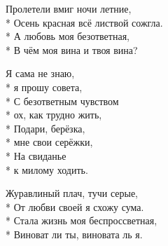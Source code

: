 \medskip

\begin{minipage}{\linewidth}
Пролетели вмиг ночи летние,\\*
Осень красная всё листвой сожгла.\\*
А любовь моя безответная,\\*
В чём моя вина и твоя вина?\\
\end{minipage}\par\medskip\nobreak

\medskip

\begin{minipage}{\linewidth}
\hspace*{1.5em}Я сама не знаю,\\*
\hspace*{1.5em}я прошу совета,\\*
\hspace*{1.5em}С безответным чувством\\*
\hspace*{1.5em}ох, как трудно жить,\\*
\hspace*{1.5em}Подари, берёзка,\\*
\hspace*{1.5em}мне свои серёжки,\\*
\hspace*{1.5em}На свиданье\\*
\hspace*{1.5em}к милому ходить.\\
\end{minipage}\par\medskip\nobreak

\medskip

\begin{minipage}{\linewidth}
Журавлиный плач, тучи серые,\\*
От любви своей я схожу сума.\\*
Стала жизнь моя беспроссветная,\\*
Виноват ли ты, виновата ль я.\\
\end{minipage}\par\medskip\nobreak

\medskip

